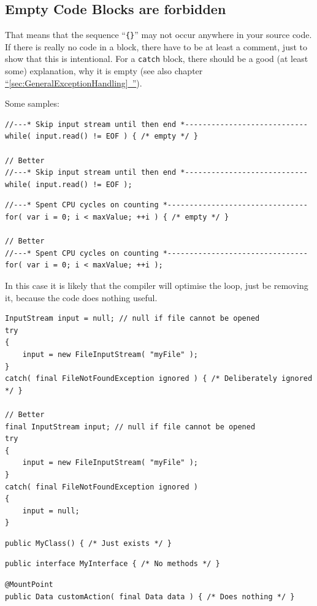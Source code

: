 \documentclass[11pt,a4paper, titlepage, parskip=half, headsepline, footsepline, cleardoublepage=current, headheight=1cm]{scrbook}
\newcommand*{\tqfullref}[1]{\hyperref[{#1}]{“\ref*{#1}~\nameref*{#1}”}}
\begin{document}

\subsection{Empty Code Blocks are forbidden}
That means that the sequence “\verb#{}#” may not occur anywhere in your source code. If there is really no code in a block, there have to be at least a comment, just to show that this is intentional. For a \lstinline|catch| block, there should be a good (at least some) explanation, why it is empty (see also chapter \tqfullref{sec:GeneralExceptionHandling}).

Some samples:
\begin{lstlisting}
//---* Skip input stream until then end *----------------------------
while( input.read() != EOF ) { /* empty */ }

// Better
//---* Skip input stream until then end *----------------------------
while( input.read() != EOF );
\end{lstlisting}
\begin{lstlisting}
//---* Spent CPU cycles on counting *--------------------------------
for( var i = 0; i < maxValue; ++i ) { /* empty */ }

// Better
//---* Spent CPU cycles on counting *--------------------------------
for( var i = 0; i < maxValue; ++i );
\end{lstlisting}
In this case it is likely that the compiler will optimise the loop, just be removing it, because the code does nothing useful.
\begin{lstlisting}
InputStream input = null; // null if file cannot be opened 
try
{
    input = new FileInputStream( "myFile" );
}
catch( final FileNotFoundException ignored ) { /* Deliberately ignored */ }

// Better
final InputStream input; // null if file cannot be opened
try
{
    input = new FileInputStream( "myFile" );
}
catch( final FileNotFoundException ignored ) 
{ 
    input = null;
}
\end{lstlisting}
\begin{lstlisting}
public MyClass() { /* Just exists */ }
\end{lstlisting}
\begin{lstlisting}
public interface MyInterface { /* No methods */ }
\end{lstlisting}
\begin{lstlisting}
@MountPoint
public Data customAction( final Data data ) { /* Does nothing */ }
\end{lstlisting}
\end{document}
